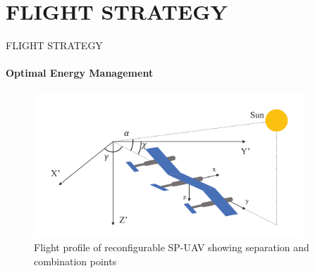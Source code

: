 \documentclass{beamer}
\begin{document}
\section{FLIGHT STRATEGY}

\begin{frame}{FLIGHT STRATEGY}
    \framesubtitle{Optimal Energy Management}
    
    \begin{figure}
        \centering
        \includegraphics[width=0.9\textwidth]{flight_strategy.png}
        \caption{Flight profile of reconfigurable SP-UAV showing separation and combination points}
        \label{fig:flight_strategy}
    \end{figure}
\end{frame}
\end{document}

